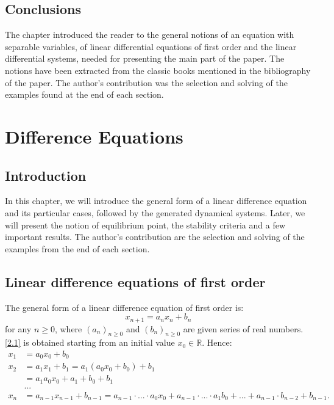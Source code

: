 \documentclass[a4paper,12pt]{report}
\newcommand{\R}{\mathbb{R}}
\begin{document}
\section{Conclusions}
The chapter introduced the reader to the general notions of an equation with separable variables, of linear differential equations of first order and the linear differential systems, needed for presenting the main part of the paper. The notions have been extracted from the classic books mentioned in the bibliography of the paper. The author's contribution was the selection and solving of the examples found at the end of each section.

    
    
    \chapter{Difference Equations}
    \section{Introduction}
    In this chapter, we will introduce the general form of a linear difference equation and its particular cases, followed by the generated dynamical systems. Later, we will present the notion of equilibrium point, the stability criteria and a few important results. The author's contribution are the selection and solving of the examples from the end of each section.
    \section{Linear difference equations of first order}
    The general form of a linear difference equation of first order is:
    \begin{equation} 
     x_{n+1}=a_{n}x_{n}+b_{n} \label{2.1}
    \end{equation}
    for any $n \geq 0$, where $(a_{n})_{n\geq 0}$ and $(b_{n})_{n\geq 0}$ are given series of real numbers. 
\eqref{2.1} is obtained starting from an initial value $x_{0} \in \R$. Hence:
\begin{align*}
 x_{1} & =a_{0}x_{0}+b_{0}\\
   x_{2} & =a_{1}x_{1}+b_{1} = a_{1}(a_{0}x_{0}+b_{0})+b_{1}\\
  & = a_{1}a_{0}x_{0}+a_{1}+b_{0}+b_{1}\\
  & ...\\
   x_{n}&=a_{n-1}x_{n-1}+b_{n-1} = a_{n-1}\cdot ... \cdot a_{0}x_{0}+a_{n-1}\cdot ...\cdot a_{1}b_{0}+...+a_{n-1}\cdot b_{n-2}+b_{n-1}.
\end{align*}
\end{document}
